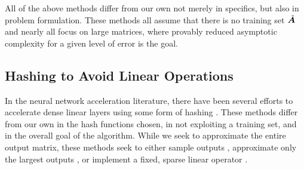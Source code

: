 All of the above methods differ from our own not merely in specifics, but also in problem formulation. These methods all assume that there is no training set $\tilde{\bm{A}}$ and nearly all focus on large matrices, where provably reduced asymptotic complexity for a given level of error is the goal. %

\vspace{-1mm}
\subsection{Hashing to Avoid Linear Operations}
In the neural network acceleration literature, there have been several efforts to accelerate dense linear layers using some form of hashing \cite{springScalable,slide,wtaSoftmax,googleWtaCvpr,hashnet}. These methods differ from our own in the hash functions chosen, in not exploiting a training set, and in the overall goal of the algorithm. While we seek to approximate the entire output matrix, these methods seek to either sample outputs \cite{springScalable,slide}, approximate only the largest outputs \cite{wtaSoftmax,googleWtaCvpr}, or implement a fixed, sparse linear operator \cite{hashnet}.


